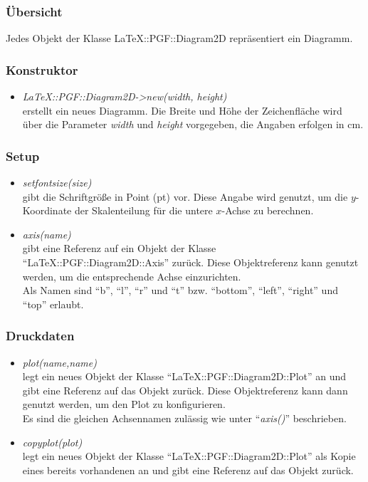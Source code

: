 \documentclass[ngerman,origlongtable]{scrartcl}
\begin{document}
\subsubsection{Übersicht}
Jedes Objekt der Klasse LaTeX::PGF::Diagram2D repräsentiert ein Diagramm.
\subsubsection{Konstruktor}
\begin{itemize}
\item	\textit{LaTeX::PGF::Diagram2D-\textgreater{}new(width, height)\/}\\
erstellt ein neues Diagramm. Die Breite und Höhe der Zeichenfläche wird
über die Parameter \textit{width\/} und \textit{height\/} vorgegeben,
die Angaben erfolgen in cm.
\end{itemize}
\subsubsection{Setup}
\begin{itemize}
\item	\textit{set\textunderscore{}font\textunderscore{}size(size)\/}\\
gibt die Schriftgröße in Point (pt) vor. Diese Angabe wird genutzt,
um die \(y\)-Koordinate der Skalenteilung für die untere \(x\)-Achse
zu berechnen.
\item	\textit{axis(name)\/}\\
gibt eine Referenz auf ein Objekt der Klasse
"`LaTeX::PGF::Diagram2D::Axis"' zurück. Diese Objektreferenz kann genutzt
werden, um die entsprechende Achse einzurichten.\\
Als Namen sind "`b"', "`l"', "`r"' und "`t"' bzw. "`bottom"', "`left"',
"`right"' und "`top"' erlaubt.
\end{itemize}
\subsubsection{Druckdaten}
\begin{itemize}
\item	\textit{plot(name,name)\/}\\
legt ein neues Objekt der Klasse "`LaTeX::PGF::Diagram2D::Plot"' an und gibt eine
Referenz auf das Objekt zurück. Diese Objektreferenz kann dann genutzt
werden, um den Plot zu konfigurieren.\\
Es sind die gleichen Achsennamen zulässig wie unter "`\textit{axis()}"'
beschrieben.
\item	\textit{copy\textunderscore{}plot(plot)\/}\\
legt ein neues Objekt der Klasse "`LaTeX::PGF::Diagram2D::Plot"' als Kopie
eines bereits vorhandenen an und gibt eine Referenz auf das Objekt zurück.\\
\end{itemize}
\end{document}
